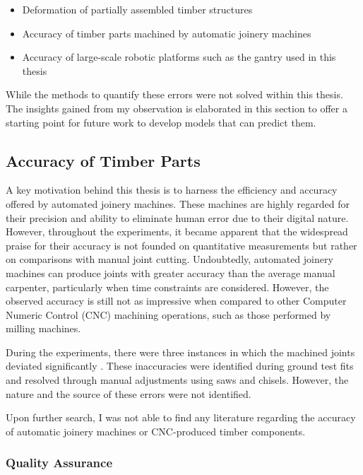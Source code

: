 \begin{itemize}[nosep]
	\item Deformation of partially assembled timber structures
	\item Accuracy of timber parts machined by automatic joinery machines
	\item Accuracy of large-scale robotic platforms such as the gantry used in this thesis
\end{itemize}

While the methods to quantify these errors were not solved within this thesis. The insights gained from my observation is elaborated in this section to offer a starting point for future work to develop models that can predict them.

\subsection{Accuracy of Timber Parts}
\label{subsection:new-hypo-accuracy-of-timber-parts}

A key motivation behind this thesis is to harness the efficiency and accuracy offered by automated joinery machines. These machines are highly regarded for their precision and ability to eliminate human error due to their digital nature. However, throughout the experiments, it became apparent that the widespread praise for their accuracy is not founded on quantitative measurements but rather on comparisons with manual joint cutting. Undoubtedly, automated joinery machines can produce joints with greater accuracy than the average manual carpenter, particularly when time constraints are considered. However, the observed accuracy is still not as impressive when compared to other Computer Numeric Control (CNC) machining operations, such as those performed by milling machines.

During the experiments, there were three instances in which the machined joints deviated significantly . These inaccuracies were identified during ground test fits and resolved through manual adjustments using saws and chisels. However, the nature and the source of these errors were not identified.

Upon further search, I was not able to find any literature regarding the accuracy of automatic joinery machines or CNC-produced timber components.

\subsubsection{Quality Assurance}
\label{subsubsection:new-hypo-quality-assurance}

